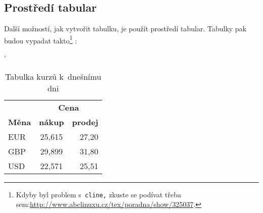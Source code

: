 \documentclass[a4paper,11pt]{article}
\begin{document}
\subsection{Prostředí tabular}
Další možností, jak vytvořit tabulku, je použít prostředí tabular. Tabulky pak budou vypadat takto\footnote{Kdyby byl problem s\texttt{ cline,} zkuste se podívat třeba sem:\href{http://www.abclinuxu.cz/tex/poradna/show/325037}{http://www.abclinuxu.cz/tex/poradna/show/325037}.} :
\bigskip
\begin{table}[ht]
\catcode`
\begin{center}
\begin{tabular}{| l | c | r |} \hline
& \multicolumn{2}{|c|}{\textbf{Cena}} \\ \cline{2-3}
\textbf{Měna} & \textbf{nákup} & \textbf{prodej} \\ \hline
EUR & 25,615 & 27,20\\
GBP & 29,899 & 31,80\\
USD & 22,571 & 25,51 \\ \hline
\end{tabular}
\caption{Tabulka kurzů k~dnešnímu dni}
\label{kurzy}
\end{center}
\end{table}
\end{document}
